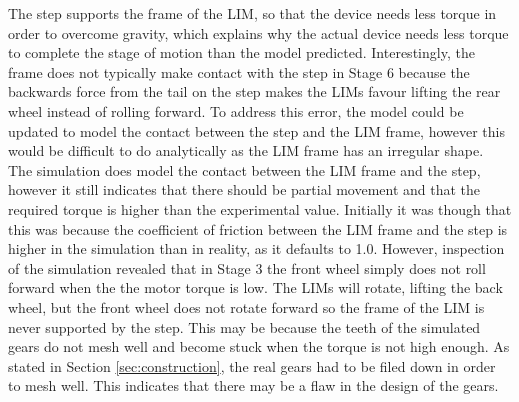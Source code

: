 The step supports the frame of the LIM, so that the device needs less torque in order to overcome gravity, which explains why the actual device needs less torque to complete the stage of motion than the model predicted. Interestingly, the frame does not typically make contact with the step in Stage 6 because the backwards force from the tail on the step makes the LIMs favour lifting the rear wheel instead of rolling forward. To address this error, the model could be updated to model the contact between the step and the LIM frame, however this would be difficult to do analytically as the LIM frame has an irregular shape. \\
The simulation does model the contact between the LIM frame and the step, however it still indicates that there should be partial movement and that the required torque is higher than the experimental value. Initially it was though that this was because the coefficient of friction between the LIM frame and the step is higher in the simulation than in reality, as it defaults to 1.0. However, inspection of the simulation revealed that in Stage 3 the front wheel simply does not roll forward when the the motor torque is low. The LIMs will rotate, lifting the back wheel, but the front wheel does not rotate forward so the frame of the LIM is never supported by the step. This may be because the teeth of the simulated gears do not mesh well and become stuck when the torque is not high enough. As stated in Section \ref{sec:construction}, the real gears had to be filed down in order to mesh well. This indicates that there may be a flaw in the design of the gears.\\

